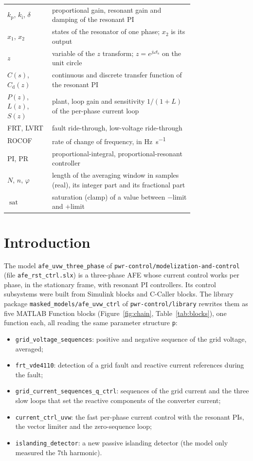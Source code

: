 \documentclass[11pt,a4paper]{scrartcl}
\newcommand{\ped}[1]{_{\mathrm{#1}}}
\newcommand{\code}[1]{\texttt{#1}}
\newcommand{\sat}{\operatorname{sat}}
\begin{document}
\begin{onehalfspace}
\begin{longtable}{@{} l p{0.76\linewidth} @{}}
	$k\ped{p}$, $k\ped{i}$, $\delta$ & proportional gain, resonant gain and damping of the resonant PI \\
	$x_1$, $x_2$ & states of the resonator of one phase; $x_2$ is its output \\
	$z$ & variable of the $z$ transform; $z = e^{j\omega t\ped{s}}$ on the unit circle \\
	$C(s)$, $C\ped{d}(z)$ & continuous and discrete transfer function of the resonant PI \\
	$P(z)$, $L(z)$, $S(z)$ & plant, loop gain and sensitivity $1/(1+L)$ of the per-phase current loop \\
	FRT, LVRT & fault ride-through, low-voltage ride-through \\
	ROCOF & rate of change of frequency, in \si{\hertz\per\second} \\
	PI, PR & proportional-integral, proportional-resonant controller \\
	$N$, $n$, $\varphi$ & length of the averaging window in samples (real), its integer part and its fractional part \\
	$\sat$ & saturation (clamp) of a value between $-$limit and $+$limit \\
\end{longtable}
\addtocounter{table}{-1}
\endgroup
\section{Introduction}
\label{sec:intro}

The model \code{afe\_uvw\_three\_phase} of \code{pwr-control/modelization-and-control} (file \code{afe\_rst\_ctrl.slx}) is a three-phase AFE whose current control works per phase, in the stationary frame, with resonant PI controllers. Its control subsystems were built from Simulink blocks and C-Caller blocks. The library package \code{masked\_models/afe\_uvw\_ctrl} of \code{pwr-control/library} \cite{library_repo} rewrites them as five MATLAB Function blocks (Figure~\ref{fig:chain}, Table~\ref{tab:blocks}), one function each, all reading the same parameter structure \code{p}:

\begin{itemize}[nosep]
	\item \code{grid\_voltage\_sequences}: positive and negative sequence of the grid voltage, averaged;
	\item \code{frt\_vde4110}: detection of a grid fault and reactive current references during the fault;
	\item \code{grid\_current\_sequences\_q\_ctrl}: sequences of the grid current and the three slow loops that set the reactive components of the converter current;
	\item \code{current\_ctrl\_uvw}: the fast per-phase current control with the resonant PIs, the vector limiter and the zero-sequence loop;
	\item \code{islanding\_detector}: a new passive islanding detector (the model only measured the 7th harmonic).
\end{itemize}


\end{onehalfspace}
\end{document}
